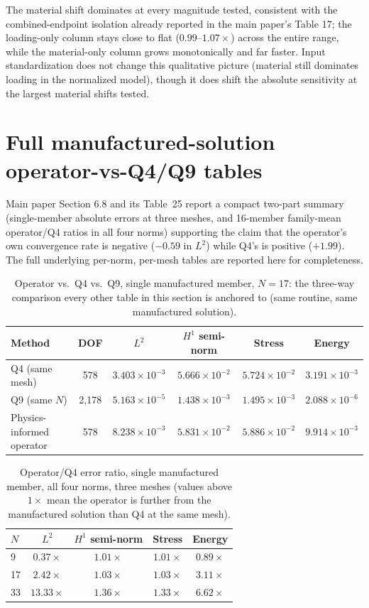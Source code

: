 \documentclass[11pt]{article}
\begin{document}
The material shift dominates at every magnitude tested, consistent with
the combined-endpoint isolation already reported in the main paper's
Table 17; the loading-only column stays close to flat ($0.99$--$1.07\times$)
across the entire range, while the material-only column grows
monotonically and far faster. Input standardization does not change this
qualitative picture (material still dominates loading in the normalized
model), though it does shift the absolute sensitivity at the largest
material shifts tested.

\FloatBarrier
\section{Full manufactured-solution operator-vs-Q4/Q9 tables}
\label{sec:s8}
Main paper Section 6.8 and its Table~25 report a compact two-part summary
(single-member absolute errors at three meshes, and 16-member family-mean
operator/Q4 ratios in all four norms) supporting the claim that the
operator's own convergence rate is negative ($-0.59$ in $L^2$) while Q4's
is positive ($+1.99$). The full underlying per-norm, per-mesh tables are
reported here for completeness.

\begin{table}[h]
\centering
\caption{Operator vs.\ Q4 vs.\ Q9, single manufactured member, $N{=}17$:
  the three-way comparison every other table in this section is anchored
  to (same routine, same manufactured solution).}
\label{tab:s8-table24}
\small
\begin{tabular}{lccccc}
\toprule
Method & DOF & $L^2$ & $H^1$ semi-norm & Stress & Energy \\
\midrule
Q4 (same mesh)              & 578   & $3.403\times10^{-3}$ & $5.666\times10^{-2}$ & $5.724\times10^{-2}$ & $3.191\times10^{-3}$ \\
Q9 (same $N$)                & 2{,}178 & $5.163\times10^{-5}$ & $1.438\times10^{-3}$ & $1.495\times10^{-3}$ & $2.088\times10^{-6}$ \\
Physics-informed operator   & 578   & $8.238\times10^{-3}$ & $5.831\times10^{-2}$ & $5.886\times10^{-2}$ & $9.914\times10^{-3}$ \\
\bottomrule
\end{tabular}
\end{table}

\begin{table}[h]
\centering
\caption{Operator/Q4 error ratio, single manufactured member, all four
  norms, three meshes (values above $1\times$ mean the operator is
  further from the manufactured solution than Q4 at the same mesh).}
\label{tab:s8-table24b}
\small
\begin{tabular}{lcccc}
\toprule
$N$ & $L^2$ & $H^1$ semi-norm & Stress & Energy \\
\midrule
9  & $0.37\times$  & $1.01\times$ & $1.01\times$ & $0.89\times$ \\
17 & $2.42\times$  & $1.03\times$ & $1.03\times$ & $3.11\times$ \\
33 & $13.33\times$ & $1.36\times$ & $1.33\times$ & $6.62\times$ \\
\bottomrule
\end{tabular}
\end{table}
\end{document}
